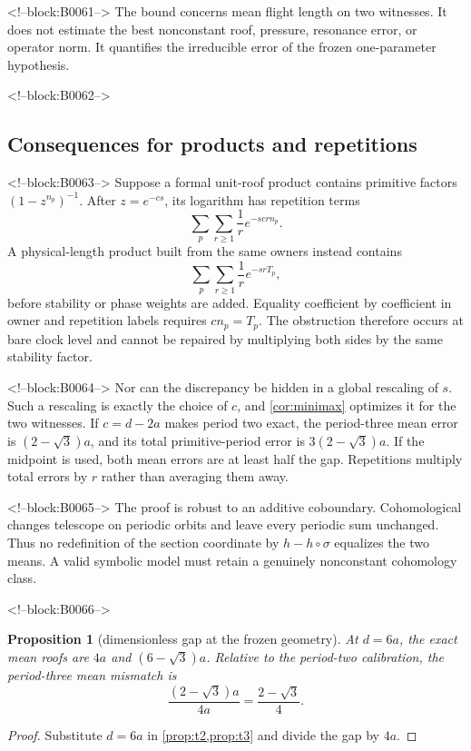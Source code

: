 \documentclass[11pt,a4paper]{article}
\newtheorem{proposition}[theorem]{Proposition}
\theoremstyle{definition}
\theoremstyle{remark}
\begin{document}
<!--block:B0061-->
The bound concerns mean flight length on two witnesses. It does not estimate the best nonconstant roof, pressure, resonance error, or operator norm. It quantifies the irreducible error of the frozen one-parameter hypothesis.

<!--block:B0062-->
\subsection{Consequences for products and repetitions}

<!--block:B0063-->
Suppose a formal unit-roof product contains primitive factors \((1-z^{n_p})^{-1}\). After \(z=e^{-cs}\), its logarithm has repetition terms
\[
 \sum_p\sum_{r\ge1}\frac{1}{r}e^{-scrn_p}.
\]
A physical-length product built from the same owners instead contains
\[
 \sum_p\sum_{r\ge1}\frac{1}{r}e^{-srT_p},
\]
before stability or phase weights are added. Equality coefficient by coefficient in owner and repetition labels requires \(cn_p=T_p\). The obstruction therefore occurs at bare clock level and cannot be repaired by multiplying both sides by the same stability factor.

<!--block:B0064-->
Nor can the discrepancy be hidden in a global rescaling of \(s\). Such a rescaling is exactly the choice of \(c\), and \cref{cor:minimax} optimizes it for the two witnesses. If \(c=d-2a\) makes period two exact, the period-three mean error is \((2-\sqrt3)a\), and its total primitive-period error is \(3(2-\sqrt3)a\). If the midpoint is used, both mean errors are at least half the gap. Repetitions multiply total errors by \(r\) rather than averaging them away.

<!--block:B0065-->
The proof is robust to an additive coboundary. Cohomological changes telescope on periodic orbits and leave every periodic sum unchanged. Thus no redefinition of the section coordinate by \(h-h\circ\sigma\) equalizes the two means. A valid symbolic model must retain a genuinely nonconstant cohomology class.

<!--block:B0066-->
\begin{proposition}[dimensionless gap at the frozen geometry]
At \(d=6a\), the exact mean roofs are \(4a\) and \((6-\sqrt3)a\). Relative to the period-two calibration, the period-three mean mismatch is
\[
 \frac{(2-\sqrt3)a}{4a}=\frac{2-\sqrt3}{4}.
\]
\end{proposition}
\begin{proof}
Substitute \(d=6a\) in \cref{prop:t2,prop:t3} and divide the gap by \(4a\).
\end{proof}
\end{document}
